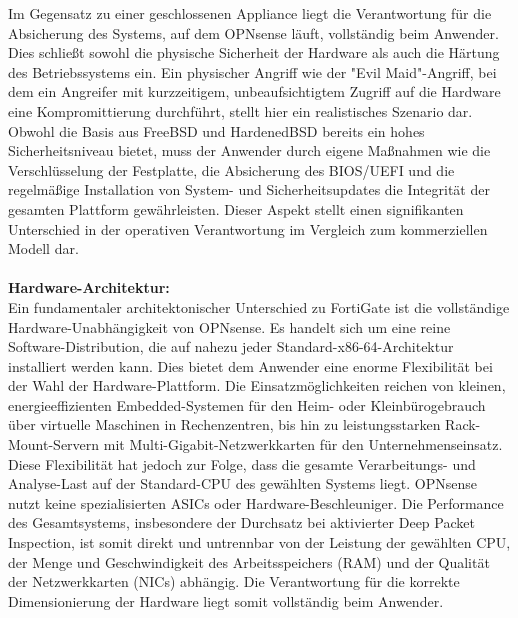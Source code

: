 Im Gegensatz zu einer geschlossenen Appliance liegt die Verantwortung für die Absicherung des Systems, auf dem OPNsense läuft, vollständig beim Anwender. Dies schließt sowohl die physische Sicherheit der Hardware als auch die Härtung des Betriebssystems ein. Ein physischer Angriff wie der "Evil Maid"-Angriff, bei dem ein Angreifer mit kurzzeitigem, unbeaufsichtigtem Zugriff auf die Hardware eine Kompromittierung durchführt, stellt hier ein realistisches Szenario dar. Obwohl die Basis aus FreeBSD und HardenedBSD bereits ein hohes Sicherheitsniveau bietet, muss der Anwender durch eigene Maßnahmen wie die Verschlüsselung der Festplatte, die Absicherung des BIOS/UEFI und die regelmäßige Installation von System- und Sicherheitsupdates die Integrität der gesamten Plattform gewährleisten. Dieser Aspekt stellt einen signifikanten Unterschied in der operativen Verantwortung im Vergleich zum kommerziellen Modell dar.\\\\

\textbf{Hardware-Architektur:}\\
Ein fundamentaler architektonischer Unterschied zu FortiGate ist die vollständige Hardware-Unabhängigkeit von OPNsense. Es handelt sich um eine reine Software-Distribution, die auf nahezu jeder Standard-x86-64-Architektur installiert werden kann. Dies bietet dem Anwender eine enorme Flexibilität bei der Wahl der Hardware-Plattform. Die Einsatzmöglichkeiten reichen von kleinen, energieeffizienten Embedded-Systemen für den Heim- oder Kleinbürogebrauch über virtuelle Maschinen in Rechenzentren, bis hin zu leistungsstarken Rack-Mount-Servern mit Multi-Gigabit-Netzwerkkarten für den Unternehmenseinsatz.\\

Diese Flexibilität hat jedoch zur Folge, dass die gesamte Verarbeitungs- und Analyse-Last auf der Standard-CPU des gewählten Systems liegt. OPNsense nutzt keine spezialisierten ASICs oder Hardware-Beschleuniger. Die Performance des Gesamtsystems, insbesondere der Durchsatz bei aktivierter Deep Packet Inspection, ist somit direkt und untrennbar von der Leistung der gewählten CPU, der Menge und Geschwindigkeit des Arbeitsspeichers (RAM) und der Qualität der Netzwerkkarten (NICs) abhängig. Die Verantwortung für die korrekte Dimensionierung der Hardware liegt somit vollständig beim Anwender.\\\\

